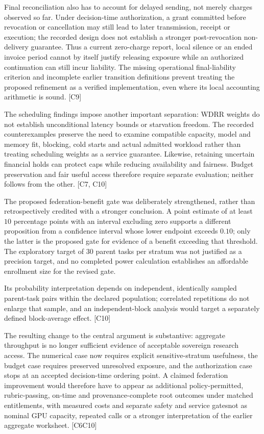 \documentclass[11pt]{article}
\begin{document}
Final reconciliation also has to account for delayed sending, not merely charges observed so far. Under decision-time authorization, a grant committed before revocation or cancellation may still lead to later transmission, receipt or execution; the recorded design does not establish a stronger post-revocation non-delivery guarantee. Thus a current zero-charge report, local silence or an ended invoice period cannot by itself justify releasing exposure while an authorized continuation can still incur liability. The missing operational final-liability criterion and incomplete earlier transition definitions prevent treating the proposed refinement as a verified implementation, even where its local accounting arithmetic is sound. [C9]

The scheduling findings impose another important separation: WDRR weights do not establish unconditional latency bounds or starvation freedom. The recorded counterexamples preserve the need to examine compatible capacity, model and memory fit, blocking, cold starts and actual admitted workload rather than treating scheduling weights as a service guarantee. Likewise, retaining uncertain financial holds can protect caps while reducing availability and fairness. Budget preservation and fair useful access therefore require separate evaluation; neither follows from the other. [C7, C10]

The proposed federation-benefit gate was deliberately strengthened, rather than retrospectively credited with a stronger conclusion. A point estimate of at least $10$ percentage points with an interval excluding zero supports a different proposition from a confidence interval whose lower endpoint exceeds $0.10$; only the latter is the proposed gate for evidence of a benefit exceeding that threshold. The exploratory target of $30$ parent tasks per stratum was not justified as a precision target, and no completed power calculation establishes an affordable enrollment size for the revised gate.

Its probability interpretation depends on independent, identically sampled parent-task pairs within the declared population; correlated repetitions do not enlarge that sample, and an independent-block analysis would target a separately defined block-average effect. [C10]

The resulting change to the central argument is substantive: aggregate throughput is no longer sufficient evidence of acceptable sovereign research access. The numerical case now requires explicit sensitive-stratum usefulness, the budget case requires preserved unresolved exposure, and the authorization case stops at an accepted decision-time ordering point. A claimed federation improvement would therefore have to appear as additional policy-permitted, rubric-passing, on-time and provenance-complete root outcomes under matched entitlements, with measured costs and separate safety and service gates\textemdash{}not as nominal GPU capacity, repeated calls or a stronger interpretation of the earlier aggregate worksheet. [C6\textendash{}C10]
\end{document}
